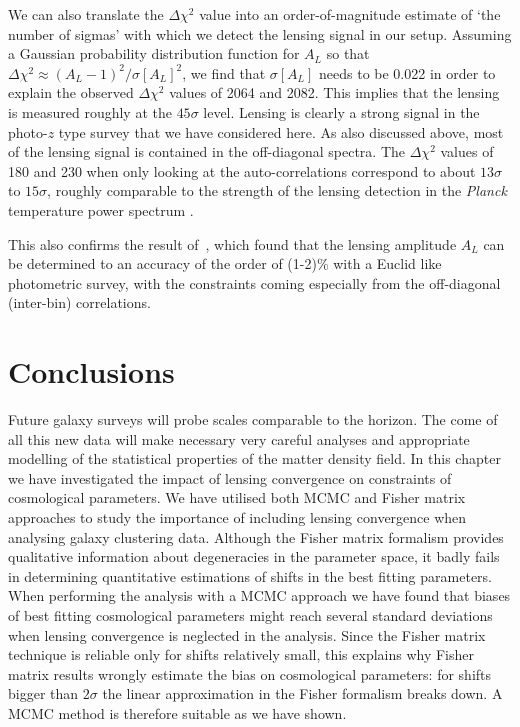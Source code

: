 We can also translate the $\Delta\chi^2$ value into an order-of-magnitude estimate of `the number of sigmas' with which we detect the lensing signal in our setup. Assuming a Gaussian probability distribution function for $A_L$ so that $\Delta\chi^2 \approx (A_L-1)^2/\sigma[A_L]^2$, we find that $\sigma[A_L]$ needs to be 0.022 in order to explain the observed $\Delta\chi^2$ values of 2064 and 2082. This implies that the lensing is measured roughly at the $45\sigma$  level. Lensing is clearly a strong signal in the photo-$z$ type survey that we have considered here. As also discussed above, most of the lensing signal is contained in the off-diagonal spectra. The $\Delta\chi^2$ values of 180 and 230 when only looking at the auto-correlations correspond to about $13\sigma$ to $15\sigma$, roughly comparable to the strength of the lensing detection in the {\it Planck} temperature power spectrum \cite{Ade:2015xua}.


This also confirms the result of~\cite{Montanari:2015rga}, which found that the lensing amplitude $A_L$ can be determined to an accuracy of the order of (1-2)\%  with a Euclid like photometric survey, with the constraints coming especially from the off-diagonal (inter-bin) correlations.


\section{Conclusions}
\label{chapter-mnu:conclusions}

Future galaxy surveys will probe scales comparable to the horizon. The come of all this new data will make necessary very careful analyses and appropriate modelling of the statistical properties of the matter density field. In this chapter we have investigated the impact of lensing convergence on constraints of cosmological parameters. We have utilised both MCMC and Fisher matrix approaches to study the importance of including lensing convergence when analysing galaxy clustering data. Although the Fisher matrix formalism provides qualitative information about degeneracies in the parameter space, it badly fails in determining quantitative estimations of shifts in the best fitting parameters. When performing the analysis with a MCMC approach we have found that biases of best fitting cosmological parameters might reach several standard deviations when lensing convergence is neglected in the analysis. Since the Fisher matrix technique is reliable only for shifts relatively small, this explains why Fisher matrix results wrongly estimate the bias on cosmological parameters: for shifts bigger than $2\sigma$ the linear approximation in the Fisher formalism breaks down. A MCMC method is therefore suitable as we have shown.

